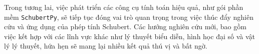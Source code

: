 \documentclass[conference,a4paper]{IEEEtran}
\begin{document}
Trong tương lai, việc phát triển các công cụ tính toán hiệu quả, như gói phần mềm \texttt{SchubertPy}, sẽ tiếp tục đóng vai trò quan trọng trong việc thúc đẩy nghiên cứu và ứng dụng của phép tính Schubert. Các hướng nghiên cứu mới, bao gồm việc kết hợp với các lĩnh vực khác như lý thuyết biểu diễn, hình học đại số và vật lý lý thuyết, hứa hẹn sẽ mang lại nhiều kết quả thú vị và bất ngờ.





\nocite{graysonschubert2}
\nocite{hiep2014schubert3}
\nocite{katz1992schubert}
\nocite{Kontsevich_1994}
\nocite{PythonTyping2023}
\nocite{PythonUnittestLib}
\nocite{SageMath2024}
\nocite{schubert1879kalkul}
\nocite{Hiep2014IntersectionTheory}
\nocite{Van2024BatBienDaiTap}

\vspace{7pt}




\appendix






\end{document}
